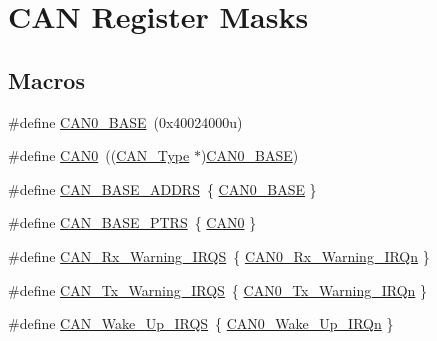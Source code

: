 \hypertarget{group___c_a_n___register___masks}{}\section{C\+AN Register Masks}
\label{group___c_a_n___register___masks}
\subsection*{Macros}
\begin{DoxyCompactItemize}
\item 
\#define \mbox{\hyperlink{group___c_a_n___register___masks_gaf28059909d16b304a2d26930aac760fd}{C\+A\+N0\+\_\+\+B\+A\+SE}}~(0x40024000u)
\item 
\#define \mbox{\hyperlink{group___c_a_n___register___masks_ga8882ee5d18ec64b8193396ec6bc66fe5}{C\+A\+N0}}~((\mbox{\hyperlink{struct_c_a_n___type}{C\+A\+N\+\_\+\+Type}} $\ast$)\mbox{\hyperlink{group___c_a_n___register___masks_gaf28059909d16b304a2d26930aac760fd}{C\+A\+N0\+\_\+\+B\+A\+SE}})
\item 
\#define \mbox{\hyperlink{group___c_a_n___register___masks_gae13d94ba45c7672726f65ae76ba7242d}{C\+A\+N\+\_\+\+B\+A\+S\+E\+\_\+\+A\+D\+D\+RS}}~\{ \mbox{\hyperlink{group___c_a_n___register___masks_gaf28059909d16b304a2d26930aac760fd}{C\+A\+N0\+\_\+\+B\+A\+SE}} \}
\item 
\#define \mbox{\hyperlink{group___c_a_n___register___masks_gaf9ce8b815aacb2022a8a7454f4028a6c}{C\+A\+N\+\_\+\+B\+A\+S\+E\+\_\+\+P\+T\+RS}}~\{ \mbox{\hyperlink{group___c_a_n___register___masks_ga8882ee5d18ec64b8193396ec6bc66fe5}{C\+A\+N0}} \}
\item 
\#define \mbox{\hyperlink{group___c_a_n___register___masks_ga5609c3f62c9fe288c8362a6e1948375e}{C\+A\+N\+\_\+\+Rx\+\_\+\+Warning\+\_\+\+I\+R\+QS}}~\{ \mbox{\hyperlink{group___interrupt__vector__numbers_gga666eb0caeb12ec0e281415592ae89083ab1adc8de178aff59fbb04bd25190847b}{C\+A\+N0\+\_\+\+Rx\+\_\+\+Warning\+\_\+\+I\+R\+Qn}} \}
\item 
\#define \mbox{\hyperlink{group___c_a_n___register___masks_ga4e858b19eac173235a4e58b2a3e69f3c}{C\+A\+N\+\_\+\+Tx\+\_\+\+Warning\+\_\+\+I\+R\+QS}}~\{ \mbox{\hyperlink{group___interrupt__vector__numbers_gga666eb0caeb12ec0e281415592ae89083a4e54a0487cda10afe462f184840c24ba}{C\+A\+N0\+\_\+\+Tx\+\_\+\+Warning\+\_\+\+I\+R\+Qn}} \}
\item 
\#define \mbox{\hyperlink{group___c_a_n___register___masks_gaab18753c846eb2768096c229c071ae71}{C\+A\+N\+\_\+\+Wake\+\_\+\+Up\+\_\+\+I\+R\+QS}}~\{ \mbox{\hyperlink{group___interrupt__vector__numbers_gga666eb0caeb12ec0e281415592ae89083a48386f75afd4280dbded9e98620284c9}{C\+A\+N0\+\_\+\+Wake\+\_\+\+Up\+\_\+\+I\+R\+Qn}} \}

\end{DoxyCompactItemize}
